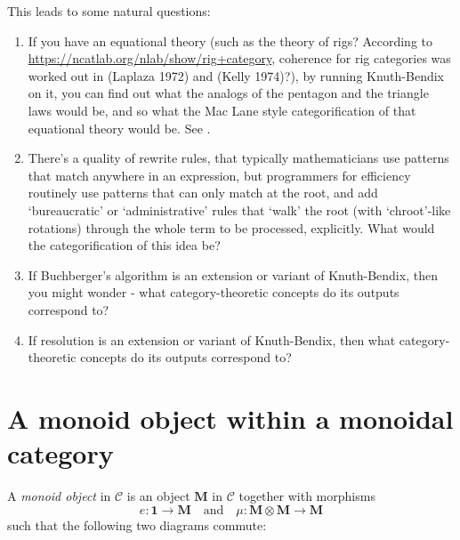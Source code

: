 \documentclass[a4paper]{article}
\begin{document}
This leads to some natural questions:
\begin{enumerate}
    \item If you have an equational theory (such as the theory of rigs? According to \url{https://ncatlab.org/nlab/show/rig+category}, coherence for rig categories was worked out in (Laplaza 1972) and (Kelly 1974)?), by running Knuth-Bendix on it, you can find out what the analogs of the pentagon and the triangle laws would be, and so what the Mac Lane style categorification of that equational theory would be. See \cite{beke2011categorification}.
    \item There's a quality of rewrite rules, that typically mathematicians use patterns that match anywhere in an expression, but programmers for efficiency routinely use patterns that can only match at the root, and add `bureaucratic' or `administrative' rules that `walk' the root (with `chroot'-like rotations) through the whole term to be processed, explicitly. What would the categorification of this idea be? 
    \item If Buchberger's algorithm is an extension or variant of Knuth-Bendix, then you might wonder - what category-theoretic concepts do its outputs correspond to?
    \item If resolution is an extension or variant of Knuth-Bendix, then what category-theoretic concepts do its outputs correspond to?

\end{enumerate}


\section{A monoid object within a monoidal category}

A \emph{monoid object} in
\(\mathcal{C}\) is an object \(\mathbf{M}\) in \(\mathcal{C}\) together with
morphisms
\[ e \colon \mathbf{1} \to \mathbf{M} \quad\text{and}\quad  \mu \colon \mathbf{M} \otimes \mathbf{M} \to \mathbf{M} \]
such that the following two diagrams commute:

\end{document}
